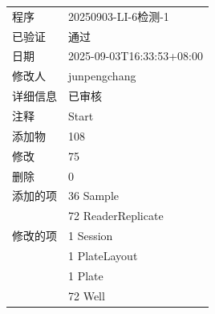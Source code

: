 \documentclass[UTF8,10pt,a4paper,fontset=fandol]{ctexart}
\newcommand{\fieldvalue}[1]{#1}
\begin{document}
\begin{tabular}{@{}p{2.5cm}p{12cm}@{}}
程序 &
\fieldvalue{20250903-LI-6检测-1} \\

已验证 &
\fieldvalue{通过} \\

日期 &
\fieldvalue{2025-09-03T16:33:53+08:00} \\

修改人 &
\fieldvalue{junpengchang} \\

详细信息 &
\fieldvalue{已审核} \\

注释 &
\fieldvalue{Start} \\

添加物 &
\fieldvalue{108} \\

修改 &
\fieldvalue{75} \\

删除 &
\fieldvalue{0} \\

添加的项 &
\fieldvalue{36 Sample} \\

&
\fieldvalue{72 ReaderReplicate} \\

修改的项 &
\fieldvalue{1 Session} \\

&
\fieldvalue{1 PlateLayout} \\

&
\fieldvalue{1 Plate} \\

&
\fieldvalue{72 Well} \\
\end{tabular}
\end{document}
